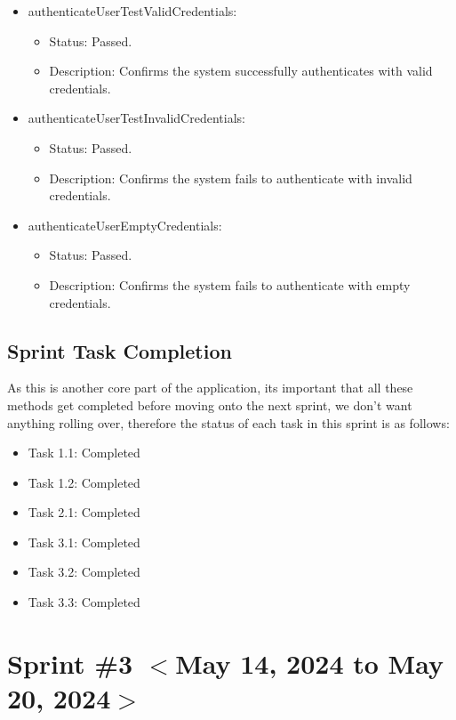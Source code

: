 \documentclass{scrreprt}
\begin{document}
\begin{itemize}
\begin{itemize}
    \end{itemize}
    \item authenticateUserTestValidCredentials:
    \begin{itemize}
        \item Status: Passed.
        \item Description: Confirms the system successfully authenticates with valid credentials.
    \end{itemize}
    \item authenticateUserTestInvalidCredentials:
    \begin{itemize}
        \item Status: Passed.
        \item Description: Confirms the system fails to authenticate with invalid credentials.
    \end{itemize}
    \item authenticateUserEmptyCredentials:
    \begin{itemize}
        \item Status: Passed.
        \item Description: Confirms the system fails to authenticate with empty credentials.
    \end{itemize}
\end{itemize}


% 
\subsection{Sprint Task Completion}
As this is another core part of the application, its important that all these methods get completed before moving onto the next sprint, we don't want anything rolling over, therefore the status of each task in this sprint is as follows:

\begin{itemize}
    \item Task 1.1: Completed
    \item Task 1.2: Completed
    \item Task 2.1: Completed
    \item Task 3.1: Completed
    \item Task 3.2: Completed
    \item Task 3.3: Completed
\end{itemize}

% 
% 
\section{Sprint \#3 $<$May 14, 2024 to May 20, 2024$>$}
\end{document}
